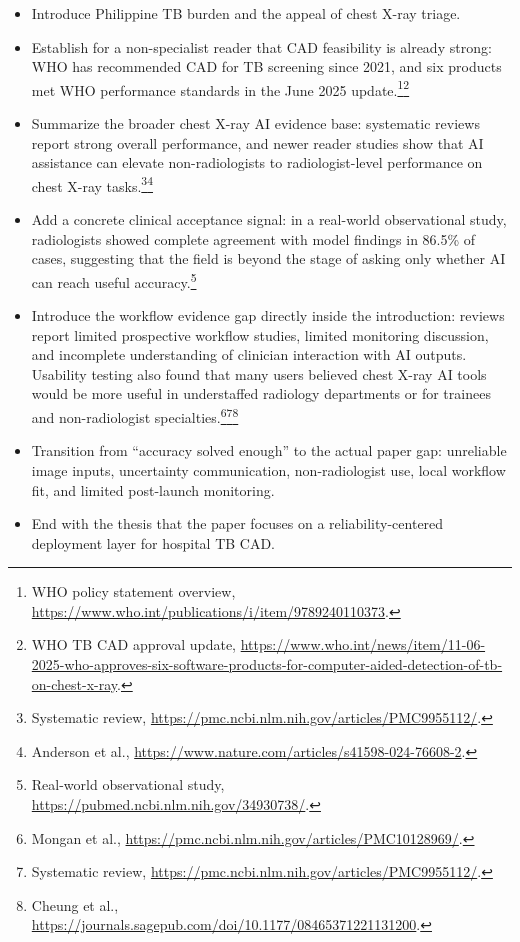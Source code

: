 \documentclass[11pt]{article}
\begin{document}
\begin{itemize}[leftmargin=1.5em]
    \item Introduce Philippine TB burden and the appeal of chest X-ray triage.
    \item Establish for a non-specialist reader that CAD feasibility is already strong: WHO has recommended CAD for TB screening since 2021, and six products met WHO performance standards in the June 2025 update.\footnote{WHO policy statement overview, \url{https://www.who.int/publications/i/item/9789240110373}.}\footnote{WHO TB CAD approval update, \url{https://www.who.int/news/item/11-06-2025-who-approves-six-software-products-for-computer-aided-detection-of-tb-on-chest-x-ray}.}
    \item Summarize the broader chest X-ray AI evidence base: systematic reviews report strong overall performance, and newer reader studies show that AI assistance can elevate non-radiologists to radiologist-level performance on chest X-ray tasks.\footnote{Systematic review, \url{https://pmc.ncbi.nlm.nih.gov/articles/PMC9955112/}.}\footnote{Anderson et al., \url{https://www.nature.com/articles/s41598-024-76608-2}.}
    \item Add a concrete clinical acceptance signal: in a real-world observational study, radiologists showed complete agreement with model findings in 86.5\% of cases, suggesting that the field is beyond the stage of asking only whether AI can reach useful accuracy.\footnote{Real-world observational study, \url{https://pubmed.ncbi.nlm.nih.gov/34930738/}.}
    \item Introduce the workflow evidence gap directly inside the introduction: reviews report limited prospective workflow studies, limited monitoring discussion, and incomplete understanding of clinician interaction with AI outputs. Usability testing also found that many users believed chest X-ray AI tools would be more useful in understaffed radiology departments or for trainees and non-radiologist specialties.\footnote{Mongan et al., \url{https://pmc.ncbi.nlm.nih.gov/articles/PMC10128969/}.}\footnote{Systematic review, \url{https://pmc.ncbi.nlm.nih.gov/articles/PMC9955112/}.}\footnote{Cheung et al., \url{https://journals.sagepub.com/doi/10.1177/08465371221131200}.}
    \item Transition from ``accuracy solved enough'' to the actual paper gap: unreliable image inputs, uncertainty communication, non-radiologist use, local workflow fit, and limited post-launch monitoring.
    \item End with the thesis that the paper focuses on a reliability-centered deployment layer for hospital TB CAD.
\end{itemize}
\end{document}
